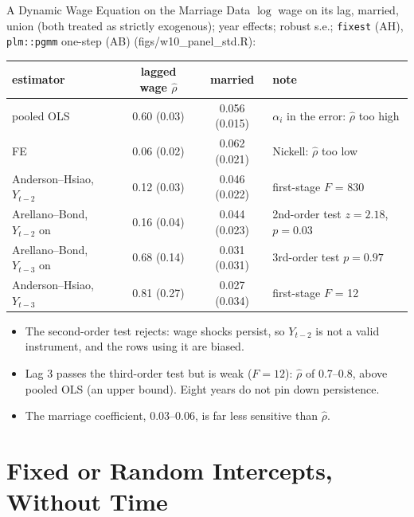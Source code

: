 \documentclass[aspectratio=169,11pt,xcolor=dvipsnames]{beamer}
\newcommand{\srcp}[1]{{\scriptsize\color{gray}(#1)}}
\begin{document}
\begin{frame}{A Dynamic Wage Equation on the Marriage Data}
$\log$ wage on its lag, married, union (both treated as strictly exogenous); year effects;
robust s.e.; \texttt{fixest} (AH), \texttt{plm::pgmm} one-step (AB) \srcp{figs/w10\_panel\_std.R}:
\vskip2pt
\begin{center}\footnotesize
\renewcommand{\arraystretch}{1.1}
\begin{tabular}{@{}lccl@{}}
\toprule
estimator & lagged wage $\hat\rho$ & married & note \\
\midrule
pooled OLS & 0.60 (0.03) & 0.056 (0.015) & $\alpha_i$ in the error: $\hat\rho$ too high \\
FE & 0.06 (0.02) & 0.062 (0.021) & Nickell: $\hat\rho$ too low \\
Anderson--Hsiao, $Y_{t-2}$ & 0.12 (0.03) & 0.046 (0.022) & first-stage $F$ = 830 \\
Arellano--Bond, $Y_{t-2}$ on & 0.16 (0.04) & 0.044 (0.023) & 2nd-order test $z = 2.18$, $p = 0.03$ \\
Arellano--Bond, $Y_{t-3}$ on & 0.68 (0.14) & 0.031 (0.031) & 3rd-order test $p = 0.97$ \\
Anderson--Hsiao, $Y_{t-3}$ & 0.81 (0.27) & 0.027 (0.034) & first-stage $F$ = 12 \\
\bottomrule
\end{tabular}
\end{center}
\vskip-2pt
\begin{itemize}\itemsep1pt
  \item The second-order test rejects: wage shocks persist, so $Y_{t-2}$ is not a
        valid instrument, and the rows using it are biased.
  \item Lag 3 passes the third-order test but is weak ($F = 12$): $\hat\rho$ of 0.7--0.8,
        above pooled OLS (an upper bound). Eight years do not pin down persistence.
  \item The marriage coefficient, 0.03--0.06, is far less sensitive than $\hat\rho$.
\end{itemize}
\end{frame}

\section[FE vs RE]{Fixed or Random Intercepts, Without Time}
\begin{frame}\sectionpage\end{frame}
\end{document}
